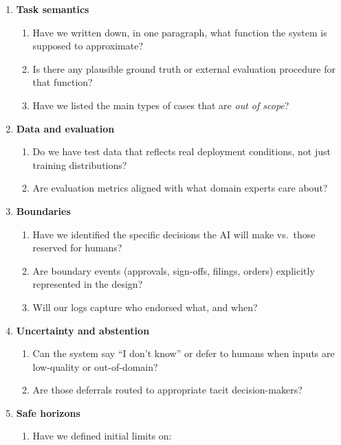\begin{enumerate}
  \item \textbf{Task semantics}
        \begin{enumerate}
          \item Have we written down, in one paragraph, what function
                the system is supposed to approximate?
          \item Is there any plausible ground truth or external
                evaluation procedure for that function?
          \item Have we listed the main types of cases that are
                \emph{out of scope}?
        \end{enumerate}
  \item \textbf{Data and evaluation}
        \begin{enumerate}
          \item Do we have test data that reflects real deployment
                conditions, not just training distributions?
          \item Are evaluation metrics aligned with what domain experts
                care about?
        \end{enumerate}
  \item \textbf{Boundaries}
        \begin{enumerate}
          \item Have we identified the specific decisions the AI will
                make vs.\ those reserved for humans?
          \item Are boundary events (approvals, sign-offs, filings,
                orders) explicitly represented in the design?
          \item Will our logs capture who endorsed what, and when?
        \end{enumerate}
  \item \textbf{Uncertainty and abstention}
        \begin{enumerate}
          \item Can the system say ``I don't know'' or defer to humans
                when inputs are low-quality or out-of-domain?
          \item Are those deferrals routed to appropriate tacit
                decision-makers?
        \end{enumerate}
  \item \textbf{Safe horizons}
        \begin{enumerate}
          \item Have we defined initial limits on:

\end{enumerate}
\end{enumerate}
